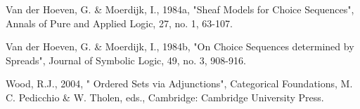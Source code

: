 \documentclass[12pt]{article}
\begin{document}
\begin{thebibliography}{199}
Van der Hoeven, G. \& Moerdijk, I., 1984a, "Sheaf Models for Choice Sequences", Annals of Pure and Applied Logic, 27, no. 1, 63-107. 

Van der Hoeven, G. \& Moerdijk, I., 1984b, "On Choice Sequences determined by Spreads", Journal of Symbolic Logic, 49, no. 3, 908-916. 

Wood, R.J., 2004, " Ordered Sets via Adjunctions", Categorical Foundations, M. C. Pedicchio \& W. Tholen, eds., Cambridge: Cambridge University Press.
 
\end{thebibliography}

\end{document}
